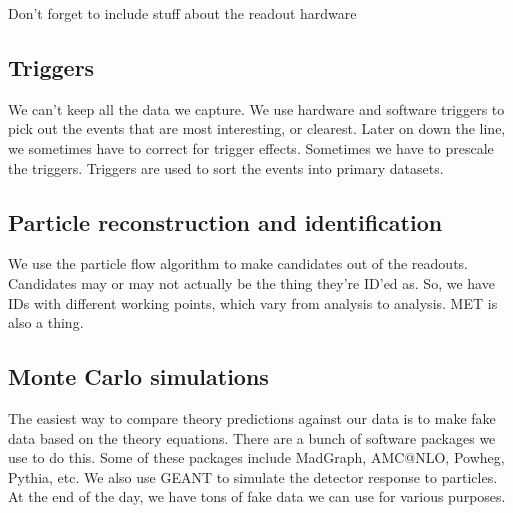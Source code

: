 Don't forget to include stuff about the readout hardware

\subsection{Triggers} %
\label{ssec:triggers}

We can't keep all the data we capture.
We use hardware and software triggers to pick out the events that are
most interesting, or clearest.
Later on down the line, we sometimes have to correct for trigger effects.
Sometimes we have to prescale the triggers.
Triggers are used to sort the events into primary datasets.

\subsection{Particle reconstruction and identification}
\label{ssec:recoandid}

We use the particle flow algorithm to make candidates out of the readouts.
Candidates may or may not actually be the thing they're ID'ed as.
So, we have IDs with different working points, which vary from analysis to analysis.
MET is also a thing.

\subsection{Monte Carlo simulations}
\label{ssec:montecarlo}

The easiest way to compare theory predictions against our data is to
make fake data based on the theory equations.
There are a bunch of software packages we use to do this.
Some of these packages include MadGraph, AMC@NLO, Powheg, Pythia, etc.
We also use GEANT to simulate the detector response to particles.
At the end of the day, we have tons of fake data we can use for various purposes.

